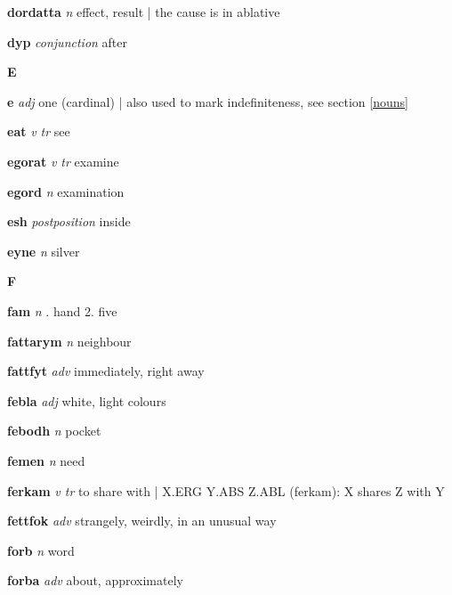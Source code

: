 \textbf{dordatta}   \emph{n} \textperiodcentered effect, result | the cause is in ablative

\textbf{dyp}   \emph{conjunction} \textperiodcentered after

\begin{center} \Huge \bfseries E \end{center}\textbf{e}   \emph{adj} \textperiodcentered one (cardinal) | also used to mark indefiniteness, see section \ref{nouns}

\textbf{eat}   \emph{v tr} \textperiodcentered see

\textbf{egorat}   \emph{v tr} \textperiodcentered examine

\textbf{egord}   \emph{n} \textperiodcentered examination

\textbf{esh}   \emph{postposition} \textperiodcentered inside

\textbf{eyne}   \emph{n} \textperiodcentered silver

\begin{center} \Huge \bfseries F \end{center}\textbf{fam}   \emph{n} . hand 2. five 

\textbf{fattarym}   \emph{n} \textperiodcentered neighbour

\textbf{fattfyt}   \emph{adv} \textperiodcentered immediately, right away

\textbf{febla}   \emph{adj} \textperiodcentered white, light colours

\textbf{febodh}   \emph{n} \textperiodcentered pocket

\textbf{femen}   \emph{n} \textperiodcentered need

\textbf{ferkam}   \emph{v tr} \textperiodcentered to share with | X.ERG Y.ABS Z.ABL (ferkam): X shares Z with Y

\textbf{fettfok}   \emph{adv} \textperiodcentered strangely, weirdly, in an unusual way

\textbf{forb}   \emph{n} \textperiodcentered word

\textbf{forba}   \emph{adv} \textperiodcentered about, approximately

